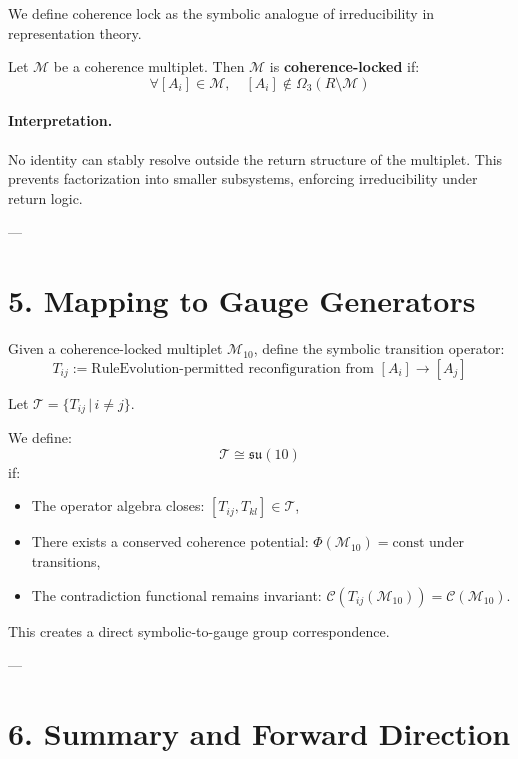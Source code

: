 We define coherence lock as the symbolic analogue of irreducibility in representation theory.

\begin{definition}
Let $\mathcal{M}$ be a coherence multiplet. Then $\mathcal{M}$ is \textbf{coherence-locked} if:
\[
\forall [A_i] \in \mathcal{M}, \quad [A_i] \notin \Omega_3(R \setminus \mathcal{M})
\]
\end{definition}

\paragraph{Interpretation.}
No identity can stably resolve outside the return structure of the multiplet. This prevents factorization into smaller subsystems, enforcing irreducibility under return logic.

---

\section{5. Mapping to Gauge Generators}
\label{sec:generator-mapping}

Given a coherence-locked multiplet $\mathcal{M}_{10}$, define the symbolic transition operator:
\[
T_{ij} := \text{RuleEvolution-permitted reconfiguration from } [A_i] \to [A_j]
\]

Let $\mathcal{T} = \{T_{ij} \,|\, i \ne j\}$.

\begin{definition}
We define:
\[
\mathcal{T} \cong \mathfrak{su}(10)
\]
if:
\begin{itemize}
  \item The operator algebra closes: $[T_{ij}, T_{kl}] \in \mathcal{T}$,
  \item There exists a conserved coherence potential: $\Phi(\mathcal{M}_{10}) = \text{const}$ under transitions,
  \item The contradiction functional remains invariant: $\mathcal{C}(T_{ij}(\mathcal{M}_{10})) = \mathcal{C}(\mathcal{M}_{10})$.
\end{itemize}
\end{definition}

This creates a direct symbolic-to-gauge group correspondence.

---

\section{6. Summary and Forward Direction}
\label{sec:summary-multiplet}

